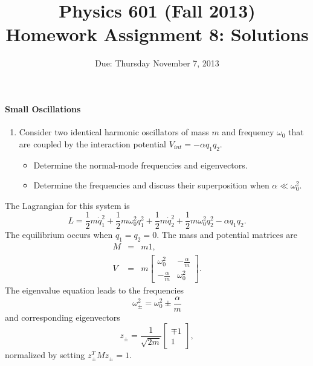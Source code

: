 \documentclass[letterpaper,11pt]{article}
\title{Physics 601 (Fall 2013) \\ Homework Assignment 8: Solutions}
\date{Due: Thursday November 7, 2013}
\begin{document}
\maketitle

\paragraph*{Small Oscillations}
\begin{enumerate}
 \item Consider two identical harmonic oscillators of mass $m$ and frequency $\omega_0$ that are coupled by the interaction potential $V_{int} = -\alpha q_1 q_2$.
 \begin{itemize}
  \item Determine the normal-mode frequencies and eigenvectors.
  \item Determine the frequencies and discuss their superposition when $\alpha \ll \omega_0^2$.
 \end{itemize}
\end{enumerate}

The Lagrangian for this system is
\begin{equation*}
 L = \frac{1}{2} m \dot{q}_1^2 + \frac{1}{2} m\omega_0^2 q_1^2 + \frac{1}{2} m \dot{q}_2^2 + \frac{1}{2} m\omega_0^2 q_2^2 - \alpha q_1 q_2.
\end{equation*}
The equilibrium occurs when $q_1 = q_2 = 0$.  The mass and potential matrices are
\begin{eqnarray*}
 M & = & m 1, \\
 V & = & m \left[ \begin{array}{cc}
                   \omega_0^2 & -\frac{\alpha}{m} \\
                   -\frac{\alpha}{m} & \omega_0^2
                  \end{array} \right].
\end{eqnarray*}
The eigenvalue equation leads to the frequencies
\begin{equation*}
 \omega_\pm^2 = \omega_0^2 \pm \frac{\alpha}{m}
\end{equation*}
and corresponding eigenvectors
\begin{equation*}
 z_\pm = \frac{1}{\sqrt{2m}} \left[ \begin{array}{cc} \mp 1 \\ 1 \end{array} \right],
\end{equation*}
normalized by setting $z_\pm^T M z_\pm = 1$.
\end{document}
